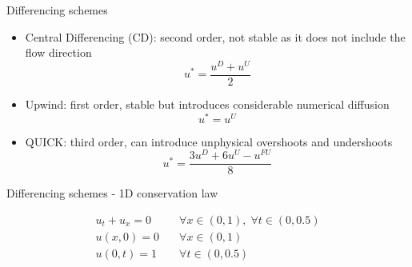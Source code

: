 \documentclass{beamer}
\begin{document}
\begin{frame}{Differencing schemes}
\begin{itemize}
	\item Central Differencing (CD): second order, not stable as it does not 
	include the flow direction
	\begin{equation*}
	u^* = \frac{u^D + u^U}{2}
	\end{equation*}
	\item Upwind: first order, stable but introduces considerable numerical 
	diffusion
	\begin{equation*}
		u^* = u^U
	\end{equation*}
	\item QUICK: third order, can introduce unphysical overshoots and 
	undershoots
	\begin{equation*}
		u^* = \frac{3u^D + 6u^U - u^{FU}}{8}
	\end{equation*}
\end{itemize}
\end{frame}
\begin{frame}{Differencing schemes - 1D conservation law}
\vspace{-0.5cm}
\begin{align*}
	u_t + u_x = 0 \quad &\forall x \in (0, 1), \; \forall t \in (0, 0.5)\\
	u(x, 0) = 0 \quad &\forall x \in (0, 1)\\
	u(0, t) = 1 \quad &\forall t \in (0, 0.5)
\end{align*}
\vspace{-1cm}
\begin{figure}
	\centering
	
\end{figure}
\end{frame}
\end{document}
